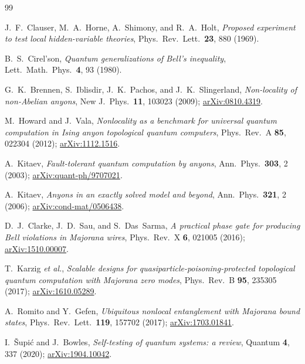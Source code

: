 \documentclass[aps,pra,twocolumn,superscriptaddress,floatfix,nofootinbib]{revtex4-2}
\begin{document}
\begin{thebibliography}{99}

J.~F.~Clauser, M.~A.~Horne, A.~Shimony, and R.~A.~Holt,
\emph{Proposed experiment to test local hidden-variable theories},
Phys.\ Rev.\ Lett.\ \textbf{23}, 880 (1969).

B.~S.~Cirel'son,
\emph{Quantum generalizations of Bell's inequality},
Lett.\ Math.\ Phys.\ \textbf{4}, 93 (1980).

G.~K.~Brennen, S.~Iblisdir, J.~K.~Pachos, and J.~K.~Slingerland,
\emph{Non-locality of non-Abelian anyons},
New J.\ Phys.\ \textbf{11}, 103023 (2009);
\href{https://arxiv.org/abs/0810.4319}{arXiv:0810.4319}.

M.~Howard and J.~Vala,
\emph{Nonlocality as a benchmark for universal quantum computation in
Ising anyon topological quantum computers},
Phys.\ Rev.\ A \textbf{85}, 022304 (2012);
\href{https://arxiv.org/abs/1112.1516}{arXiv:1112.1516}.

A.~Kitaev,
\emph{Fault-tolerant quantum computation by anyons},
Ann.\ Phys.\ \textbf{303}, 2 (2003);
\href{https://arxiv.org/abs/quant-ph/9707021}{arXiv:quant-ph/9707021}.

A.~Kitaev,
\emph{Anyons in an exactly solved model and beyond},
Ann.\ Phys.\ \textbf{321}, 2 (2006);
\href{https://arxiv.org/abs/cond-mat/0506438}{arXiv:cond-mat/0506438}.

D.~J.~Clarke, J.~D.~Sau, and S.~Das~Sarma,
\emph{A practical phase gate for producing Bell violations in Majorana wires},
Phys.\ Rev.\ X \textbf{6}, 021005 (2016);
\href{https://arxiv.org/abs/1510.00007}{arXiv:1510.00007}.

T.~Karzig \emph{et al.},
\emph{Scalable designs for quasiparticle-poisoning-protected
topological quantum computation with Majorana zero modes},
Phys.\ Rev.\ B \textbf{95}, 235305 (2017);
\href{https://arxiv.org/abs/1610.05289}{arXiv:1610.05289}.

A.~Romito and Y.~Gefen,
\emph{Ubiquitous nonlocal entanglement with Majorana bound states},
Phys.\ Rev.\ Lett.\ \textbf{119}, 157702 (2017);
\href{https://arxiv.org/abs/1703.01841}{arXiv:1703.01841}.

I.~\v{S}upi\'c and J.~Bowles,
\emph{Self-testing of quantum systems: a review},
Quantum \textbf{4}, 337 (2020);
\href{https://arxiv.org/abs/1904.10042}{arXiv:1904.10042}.


\end{thebibliography}
\end{document}
